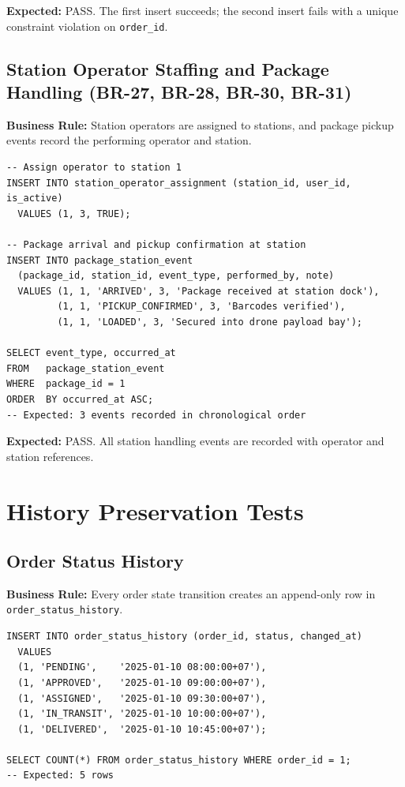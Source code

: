 \textbf{Expected:} PASS. The first insert succeeds; the second insert fails with a unique constraint violation on \texttt{order\_id}.

\subsection{Station Operator Staffing and Package Handling (BR-27, BR-28, BR-30, BR-31)}

\textbf{Business Rule:} Station operators are assigned to stations, and package pickup events record the performing operator and station.

\begin{verbatim}
-- Assign operator to station 1
INSERT INTO station_operator_assignment (station_id, user_id, is_active)
  VALUES (1, 3, TRUE);

-- Package arrival and pickup confirmation at station
INSERT INTO package_station_event
  (package_id, station_id, event_type, performed_by, note)
  VALUES (1, 1, 'ARRIVED', 3, 'Package received at station dock'),
         (1, 1, 'PICKUP_CONFIRMED', 3, 'Barcodes verified'),
         (1, 1, 'LOADED', 3, 'Secured into drone payload bay');

SELECT event_type, occurred_at
FROM   package_station_event
WHERE  package_id = 1
ORDER  BY occurred_at ASC;
-- Expected: 3 events recorded in chronological order
\end{verbatim}

\textbf{Expected:} PASS. All station handling events are recorded with operator and station references.

\section{History Preservation Tests}\label{s:historytests}

\subsection{Order Status History}

\textbf{Business Rule:} Every order state transition creates an append-only row in \texttt{order\_status\_history}.

\begin{verbatim}
INSERT INTO order_status_history (order_id, status, changed_at)
  VALUES
  (1, 'PENDING',    '2025-01-10 08:00:00+07'),
  (1, 'APPROVED',   '2025-01-10 09:00:00+07'),
  (1, 'ASSIGNED',   '2025-01-10 09:30:00+07'),
  (1, 'IN_TRANSIT', '2025-01-10 10:00:00+07'),
  (1, 'DELIVERED',  '2025-01-10 10:45:00+07');

SELECT COUNT(*) FROM order_status_history WHERE order_id = 1;
-- Expected: 5 rows
\end{verbatim}

